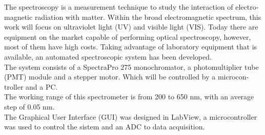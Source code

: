 \begin{otherlanguage}{english}
The spectroscopy is a measurement technique to study the interaction of electromagnetic radiation with matter.
Within the broad electromagnetic spectrum, this work will focus on ultraviolet light (UV) and visible light (VIS). Today there are equipment on the market capable of performing optical spectroscopy, however, most of them have high costs. Taking advantage of laboratory equipment that is available, an automated spectroscopic system has been developed. \\
The system consists of a SpectraPro 275 monochromator, a photomultiplier tube (PMT) module and a stepper motor. Which will be controlled by a microcontroller and a PC. \\
The working range of this spectrometer is from 200 to 650 nm, with an average step of 0.05 nm. \\
The Graphical User Interface (GUI) was designed in LabView, a microcontroller was used to control the sistem and an ADC to data acquisition.

\end{otherlanguage}{}